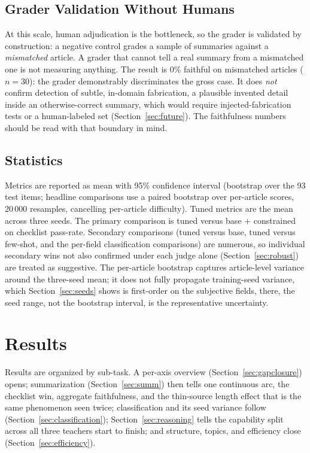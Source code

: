 \documentclass[10pt,journal]{IEEEtran}
\begin{document}
\subsection{Grader Validation Without Humans}\label{sec:negcontrol}
At this scale, human adjudication is the bottleneck, so the grader is validated by construction: a negative control grades a sample of summaries against a \emph{mismatched} article. A grader that cannot tell a real summary from a mismatched one is not measuring anything. The result is 0\% faithful on mismatched articles ($n=30$): the grader demonstrably discriminates the gross case. It does \emph{not} confirm detection of subtle, in-domain fabrication, a plausible invented detail inside an otherwise-correct summary, which would require injected-fabrication tests or a human-labeled set (Section~\ref{sec:future}). The faithfulness numbers should be read with that boundary in mind.

\subsection{Statistics}\label{sec:stats}
Metrics are reported as mean with 95\% confidence interval (bootstrap over the 93 test items; headline comparisons use a paired bootstrap over per-article scores, 20\,000 resamples, cancelling per-article difficulty). Tuned metrics are the mean across three seeds. The primary comparison is tuned versus base + constrained on checklist pass-rate. Secondary comparisons (tuned versus base, tuned versus few-shot, and the per-field classification comparisons) are numerous, so individual secondary wins not also confirmed under each judge alone (Section~\ref{sec:robust}) are treated as suggestive. The per-article bootstrap captures article-level variance around the three-seed mean; it does not fully propagate training-seed variance, which Section~\ref{sec:seeds} shows is first-order on the subjective fields, there, the seed range, not the bootstrap interval, is the representative uncertainty.

\section{Results}\label{sec:results}
Results are organized by sub-task. A per-axis overview (Section~\ref{sec:gapclosure}) opens; summarization (Section~\ref{sec:summ}) then tells one continuous arc, the checklist win, aggregate faithfulness, and the thin-source length effect that is the same phenomenon seen twice; classification and its seed variance follow (Section~\ref{sec:classification}); Section~\ref{sec:reasoning} tells the capability split across all three teachers start to finish; and structure, topics, and efficiency close (Section~\ref{sec:efficiency}).
\end{document}
